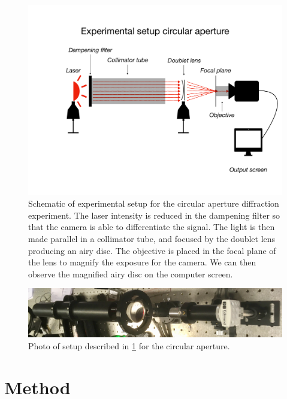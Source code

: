 \documentclass{emulateapj}
\begin{document}
\begin{figure}
	\centering
	\includegraphics[width=\linewidth]{circ_setup.pdf}
	\caption[Experimental setup circular aperture]{Schematic of experimental setup for the circular aperture diffraction experiment. The laser intensity is reduced in the dampening filter so that the camera is able to differentiate the signal. The light is then made parallel in a collimator tube, and focused by the doublet lens producing an airy disc. The objective is placed in the focal plane of the lens to magnify the exposure for the camera. We can then observe the magnified airy disc on the computer screen.}
	\label{fig: Setup circular}
\end{figure}

\begin{figure}
	\centering
	\includegraphics[scale=0.05]{circ_setup.png}
	\caption[Experimental setup circular aperture]{Photo of setup described in \cref{fig: Setup circular} for the circular aperture.}
	\label{fig: Setup circular photo}
\end{figure}

\section{Method}
\label{sec:method}
\end{document}
